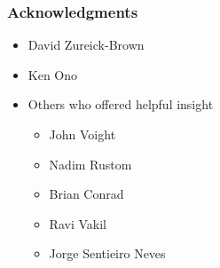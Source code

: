 \documentclass{beamer}
\theoremstyle{remark}
\begin{document}

\begin{frame}
\frametitle{Acknowledgments}
\begin{itemize}
	\item David Zureick-Brown
	\item Ken Ono
	\item Others who offered helpful insight
	\begin{itemize}
		\item John Voight
		\item Nadim Rustom
		\item Brian Conrad
		\item Ravi Vakil
		\item Jorge Sentieiro Neves
	\end{itemize}
\end{itemize}
\end{frame}
\end{document}

